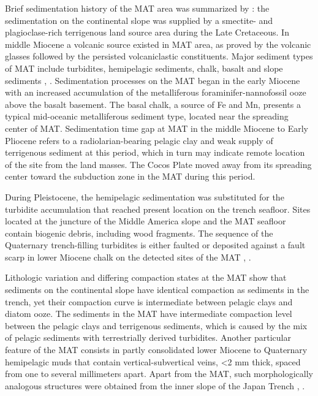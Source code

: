 \documentclass[11pt,a4paper]{report}
\begin{document}
Brief sedimentation history of the \ac{MAT} area was summarized by \cite{Kurnosovetal1982}: the sedimentation on the continental slope was supplied by a smectite- and plagioclase-rich terrigenous land source area during the Late Cretaceous. In middle Miocene a volcanic source existed in \ac{MAT} area, as proved by the volcanic glasses followed by the persisted volcaniclastic constituents. Major sediment types of \ac{MAT} include turbidites, hemipelagic sediments, chalk, basalt and slope sediments \cite{Ross1971}, \cite{Lemenkova2019108}. Sedimentation processes on the \ac{MAT} began in the early Miocene with an increased accumulation of the metalliferous foraminifer-nannofossil ooze above the basalt basement. The basal chalk, a source of Fe and Mn, presents a typical mid-oceanic metalliferous sediment type, located near the spreading center of \ac{MAT}. Sedimentation time gap at \ac{MAT} in the middle Miocene to Early Pliocene refers to a radiolarian-bearing pelagic clay and weak supply of terrigenous sediment at this period, which in turn may indicate remote location of the site from the land masses. The Cocos Plate moved away from its spreading center toward the subduction zone in the \ac{MAT} during this period. 

During Pleistocene, the hemipelagic sedimentation was substituted for the turbidite accumulation that reached present location on the trench seafloor. Sites located at the juncture of the Middle America slope and the \ac{MAT} seafloor contain biogenic debris, including wood fragments. The sequence of the Quaternary trench-filling turbidites is either faulted or deposited against a fault scarp in lower Miocene chalk on the detected sites of the \ac{MAT} \cite{Shipboard1982500}, \cite{Cowan1982}. 

Lithologic variation and differing compaction states at the \ac{MAT} show \cite{Faas1982} that sediments on the continental slope have identical compaction as sediments in the trench, yet their compaction curve is intermediate between pelagic clays and diatom ooze. The sediments in the \ac{MAT} have intermediate compaction level between the pelagic clays and terrigenous sediments, which is caused by the mix of pelagic sediments with terrestrially derived turbidites. Another particular feature of the \ac{MAT} consists in partly consolidated lower Miocene to Quaternary hemipelagic muds that contain vertical-subvertical veins, <2 mm thick, spaced from one to several millimeters apart. Apart from the \ac{MAT}, such morphologically analogous structures were obtained from the inner slope of the Japan Trench \cite{Lemenkova202012}, \cite{Lemenkova202016}.
\end{document}
